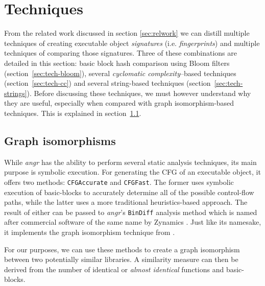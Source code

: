 \documentclass[twocolumn,a4paper]{IEEEtran} %
\begin{document}

\section{Techniques}
\label{sec:tech}
From the related work discussed in section \ref{sec:relwork} we can distill multiple techniques of creating executable object \emph{signatures} (i.e. \emph{fingerprints}) and multiple techniques of comparing those signatures. Three of these combinations are detailed in this section: basic block hash comparison using Bloom filters (section~\ref{sec:tech-bloom}), several \emph{cyclomatic complexity}--based techniques (section~\ref{sec:tech-cc}) and several string-based techniques (section~\ref{sec:tech-strings}). Before discussing these techniques, we must however understand why they are useful, especially when compared with graph isomorphism-based techniques. This is explained in section~\ref{sec:tech-graph-isomorphism}.

\subsection{Graph isomorphisms}
\label{sec:tech-graph-isomorphism}
While \emph{angr} has the ability to perform several static analysis techniques, its main purpose is symbolic execution. For generating the CFG of an executable object, it offers two methods: \texttt{CFGAccurate} and \texttt{CFGFast}. The former uses symbolic execution of basic-blocks to accurately determine all of the possible control-flow paths, while the latter uses a more traditional heuristics-based approach. The result of either can be passed to \emph{angr}'s \texttt{BinDiff} analysis method which is named after commercial software of the same name by Zynamics \cite{BinDiffZynamics}. Just like its namesake, it implements the graph isomorphism technique from \cite{dullien2005graph}.

For our purposes, we can use these methods to create a graph isomorphism between two potentially similar libraries. A similarity measure can then be derived from the number of identical or \emph{almost identical} functions and basic-blocks.
\end{document}
